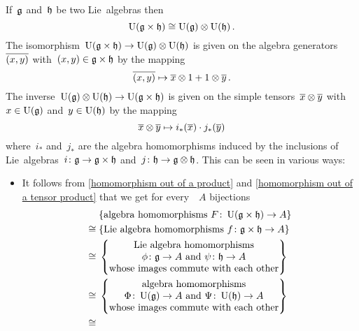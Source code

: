 \begin{example}
  If~$\mathfrak{g}$ and~$\mathfrak{h}$ be two Lie~algebras then
  \[
    \operatorname{U}(\mathfrak{g} \times \mathfrak{h})
    \cong
    \operatorname{U}(\mathfrak{g}) \otimes \operatorname{U}(\mathfrak{h}) \,.
  \]
  The isomorphism~$\operatorname{U}(\mathfrak{g} \times \mathfrak{h}) \to \operatorname{U}(\mathfrak{g}) \otimes \operatorname{U}(\mathfrak{h})$ is given on the algebra generators~$\overline{(x,y)}$ with~$(x,y) \in \mathfrak{g} \times \mathfrak{h}$ by the mapping
  \[
    \overline{(x,y)}
    \mapsto
    \overline{x} \otimes 1 + 1 \otimes \overline{y} \,.
  \]
  The inverse~$\operatorname{U}(\mathfrak{g}) \otimes \operatorname{U}(\mathfrak{h}) \to \operatorname{U}(\mathfrak{g} \times \mathfrak{h})$ is given on the simple tensors~$\overline{x} \otimes \overline{y}$ with~$x \in \operatorname{U}(\mathfrak{g})$ and~$y \in \operatorname{U}(\mathfrak{h})$ by the mapping
  \[
    \overline{x} \otimes \overline{y}
    \mapsto
    i_*(\overline{x}) \cdot j_*(\overline{y})
  \]
  where~$i_*$ and~$j_*$ are the algebra homomorphisms induced by the inclusions of Lie~algebras~$i \colon \mathfrak{g} \to \mathfrak{g} \times \mathfrak{h}$ and~$j \colon \mathfrak{h} \to \mathfrak{g} \otimes \mathfrak{h}$.
  This can be seen in various ways:
  \begin{itemize}
    \item
      It follows from \cref{homomorphism out of a product} and \cref{homomorphism out of a tensor product} that we get for every~{\algebra{$\kf$}}~$A$ bijections
      \begin{align*}
        {}&
        \{ \text{algebra homomorphisms~$F \colon \Univ(\glie \times \hlie) \to A$} \}
        \\
        \cong{}&
        \{ \text{Lie~algebra homomorphisms~$f \colon \glie \times \hlie \to A$} \}
        \\
        \cong{}&
        \left\{
          \begin{tabular}{@{}c@{}}
            Lie~algebra homomorphisms \\
            $\phi \colon \glie \to A$ and~$\psi \colon \hlie \to A$ \\
            whose images commute with each other
          \end{tabular}
        \right\}
        \\
        \cong{}&
        \left\{
          \begin{tabular}{@{}c@{}}
            algebra homomorphisms \\
            $\Phi \colon \Univ(\glie) \to A$ and~$\Psi \colon \Univ(\hlie) \to A$ \\
            whose images commute with each other
          \end{tabular}
        \right\}
        \\
        \cong{}&

\end{align*}
\end{itemize}
\end{example}
